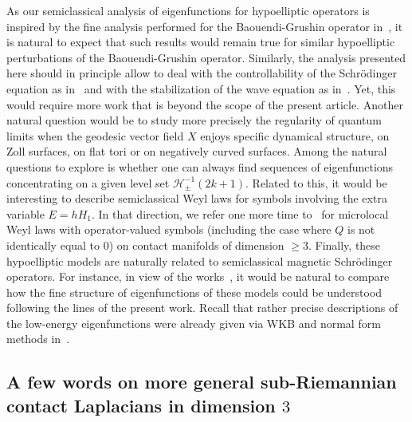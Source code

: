 \documentclass[JEP,XML,SOM,Unicode, NoEqCountersInSection,published]{cedram}
\theoremstyle{plain}
\theoremstyle{definition}
\theoremstyle{remark}
\begin{document}
As our semiclassical analysis of eigenfunctions for hypoelliptic operators is inspired by the fine analysis performed for the Baouendi-Grushin operator in~\cite{BurqSun22, ArnaizSun22}, it is natural to expect that such results would remain true for similar hypoelliptic perturbations of the Baouendi-Grushin operator. Similarly, the analysis presented here should in principle allow to deal with the controllability of the Schrödinger equation as in~\cite{BurqSun22} and with the stabilization of the wave equation as in~\cite{ArnaizSun22}. Yet, this would require more work that is beyond the scope of the present article. Another natural question would be to study more precisely the regularity of quantum limits when the geodesic vector field $X$ enjoys specific dynamical structure, \eg on Zoll surfaces, on flat tori or on negatively curved surfaces. Among the natural questions to explore is whether one can always find sequences of eigenfunctions concentrating on a given level set $\mathcal{H}_\pm^{-1}(2k+1)$. Related to this, it would be interesting to describe semiclassical Weyl laws for symbols involving the extra variable $E=hH_1$. In that direction, we refer one more time to~\cite{Taylor20} for microlocal Weyl laws with operator-valued symbols (including the case where $Q$ is not identically equal to $0$) on contact manifolds of dimension $\geq 3$. Finally, these hypoelliptic models are naturally related to semiclassical magnetic Schrödinger operators. For instance, in view of the works~\cite{RaymondVuNgoc15, HelfferKordyukovRaymondVuNgoc16, Morin19, Morin20}, it would be natural to compare how the fine structure of eigenfunctions of these models could be understood following the lines of the present work. Recall that rather precise descriptions of the low-energy eigenfunctions were already given via WKB and normal form methods in~\cite{BonthonneauRaymond20, GuedesBonthonneauRaymondVuNgoc21, GuedesBonthonneauNguyenRaymondVuNgoc21}.

\subsection{A few words on more general sub-Riemannian contact Laplacians in dimension $3$}\label{ss:general-contact}
\end{document}
